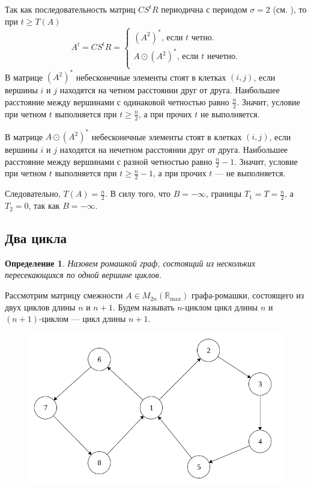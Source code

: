 \documentclass[12pt]{article}
\newtheorem{definition}[theorem]{Определение}
\begin{document}
Так как последовательность матриц $CS^tR$ периодична с периодом $\sigma = 2$ (см. \cite{15WeakCSRExpantion}), то при $t \ge T(A)$ \begin{equation*}
A^t = CS^tR = \begin{cases}
(A^2)^* \text{, если } t \text{ четно.}\\
A \odot (A^2)^*\text{, если } t \text{ нечетно.}\\
\end{cases}
\end{equation*}
В матрице $(A^2)^*$ небесконечные элементы стоят в клетках $(i, j)$, если вершины $i$ и $j$ находятся на четном расстоянии друг от друга. Наибольшее расстояние между вершинами с одинаковой четностью равно $\frac{n}{2}$. Значит, условие при четном $t$ выполняется при $t \ge \frac{n}{2}$, а при прочих $t$ не выполняется.

В матрице $A\odot(A^2)^*$ небесконечные элементы стоят в клетках $(i, j)$, если вершины $i$ и $j$ находятся на нечетном расстоянии друг от друга. Наибольшее расстояние между вершинами с разной четностью равно $\frac{n}{2} - 1$. Значит, условие при четном $t$ выполняется при $t \ge \frac{n}{2} - 1$, а при прочих $t$ --- не выполняется.

Следовательно, $T(A) = \frac{n}{2}$. В силу того, что $B = -\infty$, границы $T_1 = T = \frac{n}{2}$, а $T_2 = 0$, так как $B = -\infty$.

\subsection{Два цикла}
\begin{definition} Назовем ромашкой граф, состоящий из нескольких пересекающихся по одной вершине циклов.
\end{definition}
\label{twoCycles}
Рассмотрим матрицу смежности $A \in M_{2n}(\mathbb{R}_{\max})$ графа-ромашки, состоящего из двух циклов длины $n$ и $n + 1$. Будем называть $n$-циклом цикл длины $n$ и $(n+1)$-циклом --- цикл длины $n + 1$.
\begin{figure}[h]
  \centering
    \includegraphics[width=0.6	\textwidth]{2Cycles}
\end{figure}
\end{document}

